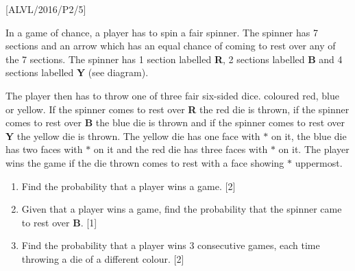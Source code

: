 \item {[}ALVL/2016/P2/5{]}

In a game of chance, a player has to spin a fair spinner. The spinner
has 7 sections and an arrow which has an equal chance of coming to
rest over any of the 7 sections. The spinner has 1 section labelled
\textbf{R}, 2 sections labelled \textbf{B} and 4 sections labelled
\textbf{Y} (see diagram). 

The player then has to throw one of three fair six-sided dice. coloured
red, blue or yellow. If the spinner comes to rest over \textbf{R}
the red die is thrown, if the spinner comes to rest over \textbf{B}
the blue die is thrown and if the spinner comes to rest over \textbf{Y}
the yellow die is thrown. The yellow die has one face with $\ast$
on it, the blue die has two faces with $\ast$ on it and the red die
has three faces with $\ast$ on it. The player wins the game if the
die thrown comes to rest with a face showing $\ast$ uppermost. 
\begin{enumerate}
\item Find the probability that a player wins a game. \hfill{}{[}2{]}
\item Given that a player wins a game, find the probability that the spinner
came to rest over \textbf{B}. \hfill{}{[}1{]}
\item Find the probability that a player wins 3 consecutive games, each
time throwing a die of a different colour. \hfill{} {[}2{]}
\end{enumerate}

